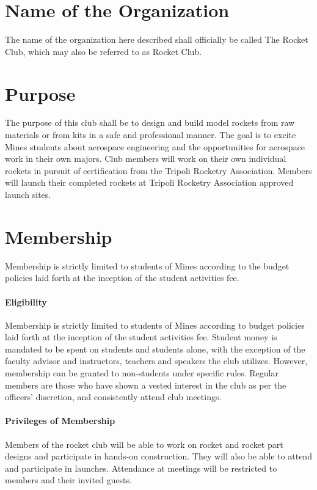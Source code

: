 \documentclass[12pt]{article}
\begin{document}
\section{Name of the Organization} 
The name of the organization here described shall officially be called The Rocket Club, which may also be referred to as Rocket Club.

\section{Purpose}
The purpose of this club shall be to design and build model rockets from raw materials or from kits in a safe and professional manner. 
The goal is to excite Mines students about aerospace engineering and the opportunities for aerospace work in their own majors. 
Club members will work on their own individual rockets in pursuit of certification from the Tripoli Rocketry Association. 
Members will launch their completed rockets at Tripoli Rocketry Association approved launch sites.

\section{Membership}
Membership is strictly limited to students of Mines according to the budget policies laid forth at the inception of the student activities fee.

\paragraph{Eligibility}
Membership is strictly limited to students of Mines according to budget policies laid forth at the inception of the student activities fee. 
Student money is mandated to be spent on students and students alone, 
with the exception of the faculty advisor and instructors, 
teachers and speakers the club utilizes. 
However, membership can be granted to non-students under specific rules. 
Regular members are those who have shown a vested interest in the club as per the officers' discretion, 
and consistently attend club meetings. 

\paragraph{Privileges of Membership}
Members of the rocket club will be able to work on rocket and rocket part designs and participate in hands-on construction.  
They will also be able to attend and participate in launches.  
Attendance at meetings will be restricted to members and their invited guests.
\end{document}
